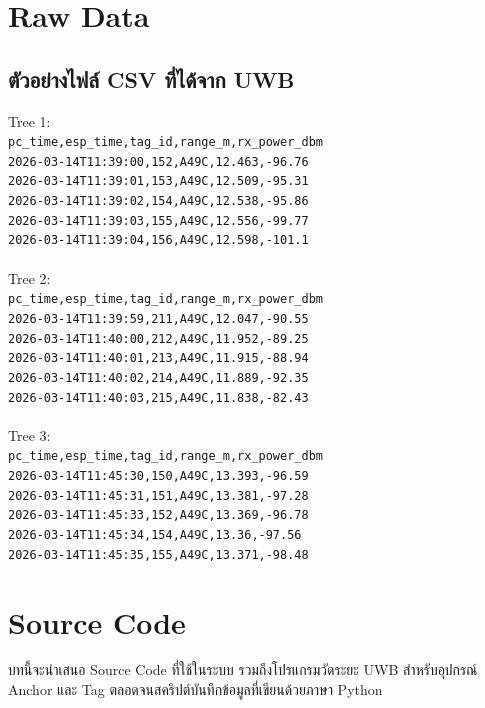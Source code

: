 \chapter{Raw Data}
\section{ตัวอย่างไฟล์ CSV ที่ได้จาก UWB}
Tree 1: \\
\verb|pc_time,esp_time,tag_id,range_m,rx_power_dbm| \\
\texttt{2026-03-14T11:39:00,152,A49C,12.463,-96.76} \\
\texttt{2026-03-14T11:39:01,153,A49C,12.509,-95.31} \\
\texttt{2026-03-14T11:39:02,154,A49C,12.538,-95.86} \\
\texttt{2026-03-14T11:39:03,155,A49C,12.556,-99.77} \\
\texttt{2026-03-14T11:39:04,156,A49C,12.598,-101.1} \\
\\Tree 2: \\
\verb|pc_time,esp_time,tag_id,range_m,rx_power_dbm| \\
\texttt{2026-03-14T11:39:59,211,A49C,12.047,-90.55} \\
\texttt{2026-03-14T11:40:00,212,A49C,11.952,-89.25} \\
\texttt{2026-03-14T11:40:01,213,A49C,11.915,-88.94} \\
\texttt{2026-03-14T11:40:02,214,A49C,11.889,-92.35} \\
\texttt{2026-03-14T11:40:03,215,A49C,11.838,-82.43} \\
\\Tree 3: \\
\verb|pc_time,esp_time,tag_id,range_m,rx_power_dbm| \\
\texttt{2026-03-14T11:45:30,150,A49C,13.393,-96.59} \\
\texttt{2026-03-14T11:45:31,151,A49C,13.381,-97.28} \\
\texttt{2026-03-14T11:45:33,152,A49C,13.369,-96.78} \\
\texttt{2026-03-14T11:45:34,154,A49C,13.36,-97.56} \\
\texttt{2026-03-14T11:45:35,155,A49C,13.371,-98.48} \\

\chapter{Source Code}
บทนี้จะนำเสนอ Source Code ที่ใช้ในระบบ รวมถึงโปรแกรมวัดระยะ UWB สำหรับอุปกรณ์ Anchor และ Tag ตลอดจนสคริปต์บันทึกข้อมูลที่เขียนด้วยภาษา Python
